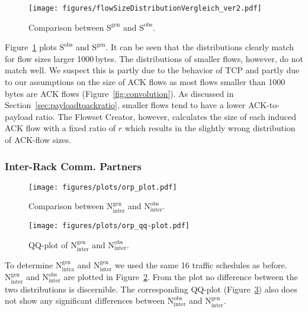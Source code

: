 \documentclass[journal,10pt]{IEEEtran}
\newcommand{\partners}[2]{\ensuremath{\mathrm{N}^{\mathrm{#1}}_{\mathrm{#2}}}}
\newcommand{\size}[1]{\ensuremath{\mathrm{S}  ^{\mathrm{#1}}}}
\begin{document}
		\begin{figure}
			\centering
\texttt{[image: figures/flowSizeDistributionVergleich\_ver2.pdf]}
				\caption{Comparison between \size{gen} and \size{obs}.}
				
				\label{fig:flowSizeDistributionVergleich}
				








			
		\end{figure}			
			
			
			Figure~\ref{fig:flowSizeDistributionVergleich} plots \size{obs} and \size{gen}.
			It can be seen that the distributions clearly match for flow sizes larger 1000\,bytes. 
			The distributions of smaller flows, however, do not match well.
			We suspect this is partly due to the behavior of TCP and partly due to our assumptions on the size of ACK flows
			as most flows smaller than 1000\,bytes are ACK flows (Figure~\ref{fig:convolution}).
			As discussed in Section~\ref{sec:payloadtoackratio}, smaller flows tend to have a lower ACK-to-payload ratio.
			The Flowset Creator, however, calculates the size of each induced ACK flow with a fixed ratio of $r$ which results in 
			the slightly wrong distribution of ACK-flow sizes.
			
			
		\subsubsection{Inter-Rack Comm. Partners}
			\begin{figure}
				\centering
					\texttt{[image: figures/plots/orp\_plot.pdf]}
					\caption{Comparison between \partners{gen}{inter} and \partners{obs}{inter}.}
					\label{fig:orp_plot}
\end{figure}
		
			\begin{figure}
				\centering
					\texttt{[image: figures/plots/orp\_qq-plot.pdf]}
					\caption{QQ-plot of \partners{gen}{inter} and \partners{obs}{inter}.}
					
					\label{fig:orp_qq-plot}
\end{figure}			
			
			To determine
			\partners{gen}{intra} and \partners{gen}{inter}
			we used the same 16 traffic schedules as before.
\partners{gen}{inter} and \partners{obs}{inter} are plotted in Figure~\ref{fig:orp_plot}.
			From the plot no difference between the two distributions is discernible.
			The corresponding QQ-plot (Figure~\ref{fig:orp_qq-plot}) also does not show any significant differences
			between \partners{obs}{inter} and \partners{gen}{inter}.
		
\end{document}
